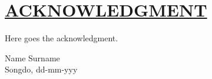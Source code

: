 \section*{\uline{ACKNOWLEDGMENT}}
\fontsize{13}{20}\selectfont 
Here goes the acknowledgment.
\begin{flushright}
Name Surname\\
Songdo, dd-mm-yyy
\end{flushright}



\pagebreak


\clearpage\mbox{}\clearpage